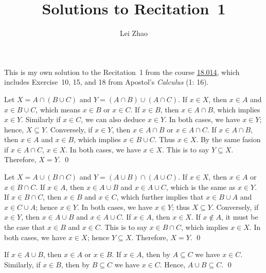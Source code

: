 

\title{\bf Solutions to Recitation~1}
\author{Lei Zhao}


\maketitle
This is my own solution to the Recitation~1 from the course
\href{https://ocw.mit.edu/courses/mathematics/18-014-calculus-with-theory-fall-2010/recitations/}{18.014},
which includes Exercise~10, 15, and 18 from Apostol's \textit{Calculus}
(1: 16).


 {Let
  \(X = A \cap (B \cup C)\) and \(Y = (A \cap B) \cup (A \cap C)\).
  If \(x \in X\), then \(x \in A\) and \(x \in B \cup C\), which means
  \(x \in B\) or \(x \in C\).  If \(x \in B\), then
  \(x \in A \cap B\), which implies \(x \in Y\).  Similarly if
  \(x \in C\), we can also deduce \(x \in Y\).  In both cases, we have
  \(x \in Y\); hence, \(X \subseteq Y\).  Conversely, if \(x \in Y\),
  then \(x \in A \cap B\) or \(x \in A \cap C\).  If
  \(x \in A \cap B\), then \(x \in A\) and \(x \in B\), which implies
  \(x \in B \cup C\). Thus \(x \in X\).  By the same fasion if
  \(x \in A \cap C\), \(x \in X\).  In both cases, we have
  \(x \in X\).  This is to say \(Y \subseteq X\).  Therefore,
  \(X = Y\). \qed}

{\parasp Let \(X = A \cup (B \cap C)\) and
  \(Y = (A \cup B) \cap (A \cup C)\).  If \(x \in X\), then
  \(x \in A\) or \(x \in B \cap C\).  If \(x \in A\), then
  \(x \in A \cup B\) and \(x \in A \cup C\), which is the same as
  \(x \in Y\).  If \(x \in B \cap C\), then \(x \in B\) and
  \(x \in C\), which further implies that \(x \in B \cup A\) and
  \(x \in C \cup A\); hence \(x \in Y\).  In both cases, we have
  \(x \in Y\); thus \(X \subseteq Y\).  Conversely, if \(x \in Y\),
  then \(x \in A \cup B\) and \(x \in A \cup C\).  If \(x \in A\),
  then \(x \in X\).  If \(x \notin A\), it must be the case that
  \(x \in B\) and \(x \in C\).  This is to say \(x \in B \cap C\),
  which implies \(x \in X\).  In both cases, we have \(x \in X\);
  hence \(Y \subseteq X\).  Therefore, \(X = Y\). \qed}

  {If \(x \in A \cup B\), then \(x \in A\)
  or \(x \in B\).  If \(x \in A\), then by \(A \subseteq C\) we have
  \(x \in C\).  Similarly, if \(x \in B\), then by \(B \subseteq C\)
  we have \(x \in C\).  Hence, \(A \cup B \subseteq C\). \qed}


